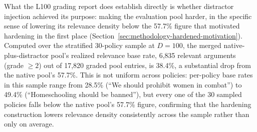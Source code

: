 What the L100 grading report does establish directly is whether distractor injection achieved its
purpose: making the evaluation pool harder, in the specific sense of lowering its relevance
density below the 57.7\% figure that motivated hardening in the first place
(Section~\ref{sec:methodology-hardened-motivation}). Computed over the stratified 30-policy sample
at $D=100$, the merged native-plus-distractor pool's realized relevance base rate, 6,835 relevant
arguments (grade $\geq 2$) out of 17,820 graded pool entries, is 38.4\%, a substantial drop from
the native pool's 57.7\%. This is not uniform across policies: per-policy base rates in this
sample range from 28.5\% (``We should prohibit women in combat'') to 49.4\% (``Homeschooling
should be banned''), but every one of the 30 sampled policies falls below the native pool's
57.7\% figure, confirming that the hardening construction lowers relevance density consistently
across the sample rather than only on average.